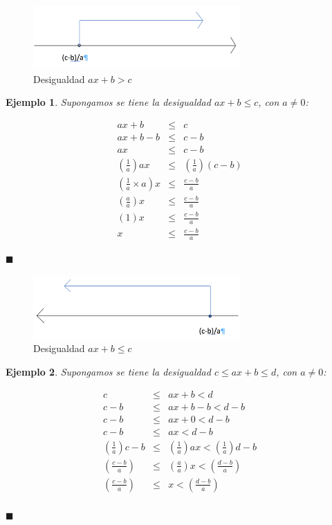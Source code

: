 \documentclass[]{book}
\newtheorem{Ejem}{Ejemplo}[chapter]
\begin{document}
\begin{figure}
\centering
\includegraphics[width=3.12500in]{Desigualdad1.png}
\caption{Desigualdad \(ax+b>c\)}
\end{figure}

\begin{Ejem}
Supongamos se tiene la desigualdad $ax+b\leq c$, con $a\neq0$: 

\begin{eqnarray*}
ax+b&\leq&c\\
ax+b-b&\leq&c-b\\
ax&\leq&c-b\\
\left(\frac{1}{a}\right)ax&\leq&\left(\frac{1}{a}\right)\left(c-b\right)\\
\left(\frac{1}{a}\times a\right)x&\leq&\frac{c-b}{a}\\
\left(\frac{a}{a}\right)x&\leq&\frac{c-b}{a}\\
\left(1\right)x&\leq&\frac{c-b}{a}\\
x&\leq&\frac{c-b}{a}
\end{eqnarray*}
\begin{flushright}
$\blacksquare$
\end{flushright}

\end{Ejem}

\begin{figure}
\centering
\includegraphics[width=3.12500in]{Desigualdad2.png}
\caption{Desigualdad \(ax+b\leq c\)}
\end{figure}

\begin{Ejem}
Supongamos se tiene la desigualdad $c\leq ax+b\leq d$, con $a\neq0$: 

\begin{eqnarray*}
c&\leq& ax+b<d\\
c-b&\leq& ax+b-b<d-b\\
c-b&\leq& ax+0<d-b\\
c-b&\leq& ax<d-b\\
\left(\frac{1}{a}\right)c-b&\leq& \left(\frac{1}{a}\right)ax<\left(\frac{1}{a}\right)d-b\\
\left(\frac{c-b}{a}\right)&\leq& \left(\frac{a}{a}\right)x<\left(\frac{d-b}{a}\right)\\
\left(\frac{c-b}{a}\right)&\leq& x<\left(\frac{d-b}{a}\right)\\
\end{eqnarray*}
\begin{flushright}
$\blacksquare$
\end{flushright}

\end{Ejem}
\end{document}
